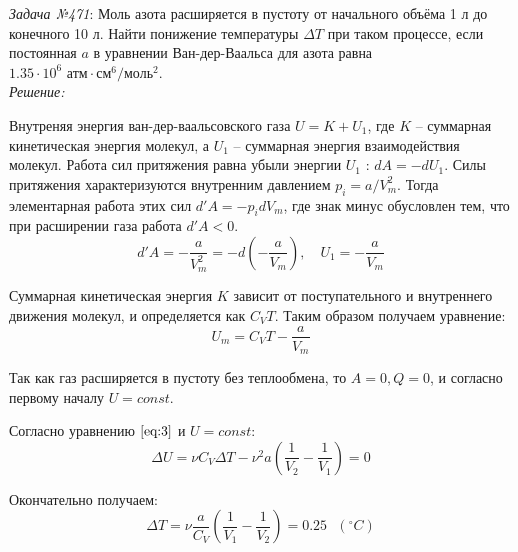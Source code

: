 \documentclass[14pt,final,titlepage,pscyr]{hedsemwork}
\begin{document}
\newpage
\emph{Задача №471}: Моль азота расширяется в пустоту от начального объёма 
1 л до конечного 10 л. Найти понижение температуры \( \Delta T \) при 
таком процессе, если постоянная \( a \) в уравнении Ван-дер-Ваальса для 
азота равна \( 1.35\cdot10^6 \text{ атм}\cdot\text{см}^6/\text{моль}^2 \). \\

\emph{Решение:}

Внутреняя энергия ван-дер-ваальсовского газа \( U = K + U_1 \), где 
\( K \) -- суммарная кинетическая энергия молекул, а \( U_1 \) -- суммарная 
энергия взаимодействия молекул. Работа сил притяжения равна убыли энергии 
\( U_1 \) : \( dA = -dU_1 \). Силы притяжения характеризуются внутренним 
давлением \( p_i = a / V^2_m \). Тогда элементарная работа этих сил
\( d'A = -p_i dV_m \), где знак минус обусловлен тем, что при расширении газа 
работа \( d'A < 0 \).
\[
	d'A = -\frac{a}{V^2_m} = -d\left( -\frac{a}{V_m} \right), \quad
	U_1 = -\frac{a}{V_m}
\] 

Суммарная кинетическая энергия \( K \) зависит от поступательного и 
внутреннего движения молекул, и определяется как \( C_V T \). Таким образом 
получаем уравнение:
\begin{equation}
	U_m = C_V T - \frac{a}{V_m}
	\label{eq:3}
\end{equation} 

Так как газ расширяется в пустоту без теплообмена, то \( A = 0, Q = 0 \), и 
согласно первому началу \( U = const \).

Согласно уравнению \( \ref{eq:3} \) и \( U = const \):
\[
	\Delta U = \nu C_V \Delta T - \nu^2 a 
		\left( \frac{1}{V_2} - \frac{1}{V_1} \right) = 0
\]

Окончательно получаем:
\[
	\Delta T = \nu\frac{a}{C_V}\left( \frac{1}{V_1} - \frac{1}{V_2} \right) = 
		0.25 \text{ } (^\circ C)
\]
\end{document}
